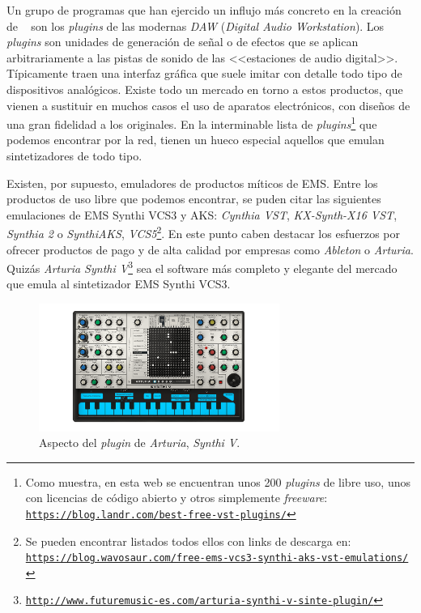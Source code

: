 Un grupo de programas que han ejercido un influjo más concreto en la creación de \appName~ son los \textit{plugins} de las modernas \textit{DAW} (\textit{Digital Audio Workstation}). Los \textit{plugins} son unidades de generación de señal o de efectos que se aplican arbitrariamente a las pistas de sonido de las <<estaciones de audio digital>>. Típicamente traen una interfaz gráfica que suele imitar con detalle todo tipo de dispositivos analógicos. Existe todo un mercado en torno a estos productos, que vienen a sustituir en muchos casos el uso de aparatos electrónicos, con diseños de una gran fidelidad a los originales. En la interminable lista de \textit{plugins}\footnote{Como muestra, en esta web se encuentran unos 200 \textit{plugins} de libre uso, unos con licencias de código abierto y otros simplemente \textit{freeware}: \href{https://blog.landr.com/best-free-vst-plugins/}{\texttt{https://blog.landr.com/best-free-vst-plugins/}}} que podemos encontrar por la red, tienen un hueco especial aquellos que emulan sintetizadores de todo tipo. 

Existen, por supuesto, emuladores de productos míticos de EMS. Entre los productos de uso libre que podemos encontrar, se puden citar las siguientes emulaciones de EMS Synthi VCS3 y AKS: \textit{Cynthia VST}, \textit{KX-Synth-X16 VST}, \textit{Synthia 2} o \textit{SynthiAKS}, \textit{VCS5}\footnote{Se pueden encontrar listados todos ellos con links de descarga en: \href{https://blog.wavosaur.com/free-ems-vcs3-synthi-aks-vst-emulations/}{\texttt{https://blog.wavosaur.com/free-ems-vcs3-synthi-aks-vst-emulations/}}}. En este punto caben destacar los esfuerzos por ofrecer productos de pago y de alta calidad por empresas como \textit{Ableton} o \textit{Arturia}. Quizás \textit{Arturia Synthi V}\footnote{\href{http://www.futuremusic-es.com/arturia-synthi-v-sinte-plugin/}{\texttt{http://www.futuremusic-es.com/arturia-synthi-v-sinte-plugin/}}} sea el software más completo y elegante del mercado que emula al sintetizador EMS Synthi VCS3.

\begin{figure}
	\centering
	\includegraphics[width=0.7\textwidth]{./synthi_v_arturia}
	\caption[\textit{Arturia Synthi V}]{Aspecto del \textit{plugin} de \textit{Arturia}, \textit{Synthi V}.}
	\label{fig:synthi_v_arturia}
\end{figure}


